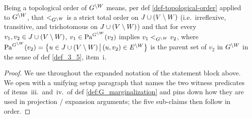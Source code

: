 \documentclass[main]{subfiles}
\begin{document}
\begin{Rem}[MargPreservesAncestors]
\begin{enumerate}[label=\roman*.)]
\begin{enumerate}[label=(\alph*)]
                    Being a topological order of $G^{\setminus W}$ means, per def \ref{def-topological-order} applied to $G^{\setminus W}$, that $<_{G^{\setminus W}}$ is a strict total order on $J \cup (V \setminus W)$ (i.e.\ irreflexive, transitive, and trichotomous on $J \cup (V \setminus W)$) and that for every $v_1, v_2 \in J \cup (V \setminus W)$, $v_1 \in \mathrm{Pa}^{G^{\setminus W}}(v_2)$ implies $v_1 <_{G^{\setminus W}} v_2$, where $\mathrm{Pa}^{G^{\setminus W}}(v_2) = \left \{ u \in J \cup (V \setminus W) \,\middle|\, (u, v_2) \in E^{\setminus W} \right \}$ is the parent set of $v_2$ in $G^{\setminus W}$ in the sense of def \ref{def_3_5}, item~i.
            \end{enumerate}
    \end{enumerate}
\end{Rem}

\begin{proof}

We use throughout the expanded notation of the statement block above. We open with a unifying setup paragraph that names the two witness predicates of items~iii.\ and~iv.\ of def \ref{def:G_marginalization} and pins down how they are used in projection / expansion arguments; the five sub-claims then follow in order.


\end{proof}
\end{document}
